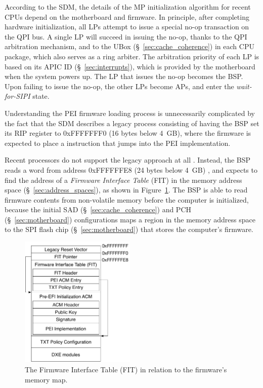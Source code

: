 According to the SDM, the details of the MP initialization algorithm for recent
CPUs depend on the motherboard and firmware. In principle, after completing
hardware initialization, all LPs attempt to issue a special no-op transaction
on the QPI bus. A single LP will succeed in issuing the no-op, thanks to
the QPI arbitration mechanism, and to the UBox (\S~\ref{sec:cache_coherence})
in each CPU package, which also serves as a ring arbiter. The arbitration
priority of each LP is based on its APIC ID (\S~\ref{sec:interrupts}), which is
provided by the motherboard when the system powers up. The LP that issues the
no-op becomes the BSP. Upon failing to issue the no-op, the other LPs become
APs, and enter the \textit{wait-for-SIPI} state.


Understanding the PEI firmware loading process is unnecessarily complicated by
the fact that the SDM describes a legacy process consisting of having the BSP
set its RIP register to 0xFFFFFFF0 (16 bytes below 4~GB), where the firmware is
expected to place a instruction that jumps into the PEI implementation.


Recent processors do not support the legacy approach at all
\cite{reinauer2013fitpatch}. Instead, the BSP reads a word from address
0xFFFFFFE8 (24 bytes below 4~GB) \cite{intel2012uefihypervisor, datta2013acm},
and expects to find the address of a \textit{Firmware Interface Table} (FIT)
in the memory address space (\S~\ref{sec:address_spaces}), as shown in
Figure~\ref{fig:firmware_fit}. The BSP is able to read firmware contents from
non-volatile memory before the computer is initialized, because the initial SAD
(\S~\ref{sec:cache_coherence}) and PCH (\S~\ref{sec:motherboard})
configurations maps a region in the memory address space to the SPI flash chip
(\S~\ref{sec:motherboard}) that stores the computer's firmware.

\begin{figure}[hbt]
  \centering
  \includegraphics[width=55mm]{figures/firmware_fit.pdf}
  \caption{
    The Firmware Interface Table (FIT) in relation to the firmware's memory
    map.
  }
  \label{fig:firmware_fit}
\end{figure}

